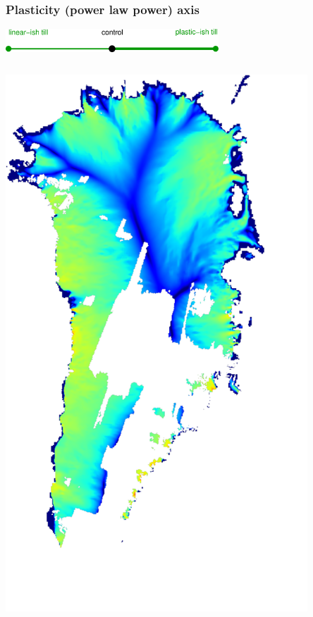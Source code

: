 \documentclass{beamer}
\begin{document}
\begin{frame}
  \frametitle{Plasticity (power law power) axis}

\vspace{-0.1in}
\begin{center}
  \includegraphics[width=0.6\textwidth]{plastic_axis}
\end{center}

\vspace{-0.1in}
\begin{columns}
\begin{column}{0.33\textwidth}
\begin{center}
  \includegraphics[width=0.85\textwidth]{g3km_3_50_98}

\end{center}
\end{column}
\end{columns}
\end{frame}
\end{document}
